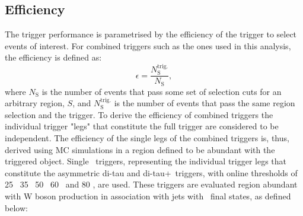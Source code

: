 	\subsection*{Efficiency}
	The trigger performance is parametrised by the efficiency of the trigger to select events of interest.  
	For combined triggers such as the ones used in this analysis, the efficiency is defined as:
	\begin{equation}
		\epsilon = \frac{N_{\mathrm{S}}^{\mathrm{trig.}}}{N_{\mathrm{S}}},
		\label{eq:trig_eff}
	\end{equation}		
	where $N_{\mathrm{S}}$ is the number of events that pass some set of selection cuts for an arbitrary region, $S$, and  $N_{\mathrm{S}}^{\mathrm{trig.}}$ is the number of events that pass the same region selection and the trigger.
	To derive the efficiency of combined triggers  the individual trigger "legs" that constitute the full  trigger are considered to be independent. 
	The efficiency of the single legs of the combined triggers is, thus, derived using \ac{MC} simulations in a region defined to be abundant with the triggered object. 
	 Single \ltau\ triggers, representing the individual trigger legs that constitute the asymmetric di-tau and di-tau+\met\ triggers, with online thresholds of 25 \gev\, 35 \gev\, 50 \gev\, 60 \gev\, and 80 \gev, are used.
	These triggers are evaluated region abundant with W boson production in association with jets with \htau\ final states, as defined below:
